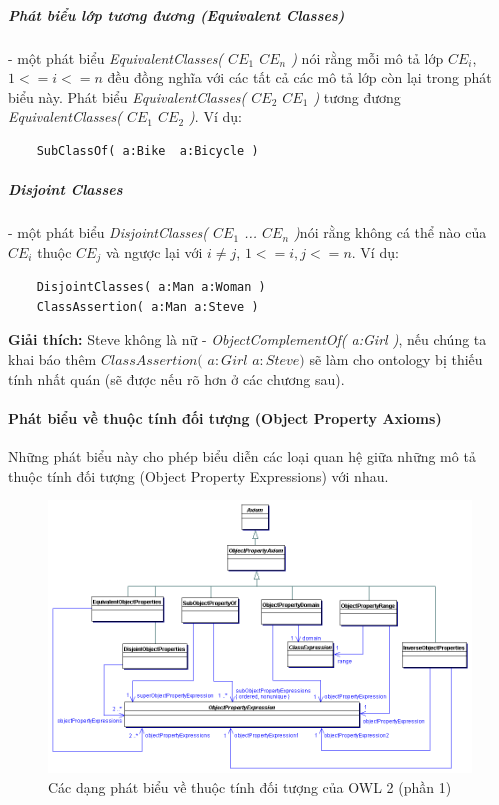 	\subparagraph{Phát biểu lớp tương đương (Equivalent Classes)} - một phát biểu \textit{EquivalentClasses( $CE_{1}$ $CE_{n}$ )} nói rằng mỗi mô tả lớp $CE_{i}$, $1<=i<=n$ đều đồng nghĩa với các tất cả các mô tả lớp còn lại trong phát biểu này. Phát biểu \textit{EquivalentClasses( $CE_{2}$ $CE_{1}$ )} tương đương \textit{EquivalentClasses( $CE_{1}$ $CE_{2}$ )}. Ví dụ:
	\begin{verbatim}
	SubClassOf( a:Bike  a:Bicycle )
	\end{verbatim}
	
	\subparagraph{Disjoint Classes} - một phát biểu \textit{DisjointClasses( $CE_{1}$ ... $CE_{n}$ )}nói rằng không cá thể nào của $CE_{i}$ thuộc $CE_{j}$ và ngược lại với $i \neq j$, $1<=i,j<=n$. Ví dụ:
	\begin{verbatim}
	DisjointClasses( a:Man a:Woman )	
	ClassAssertion( a:Man a:Steve )
	\end{verbatim}
	\textbf{Giải thích:} Steve không là nữ - \textit{ObjectComplementOf( a:Girl )}, nếu chúng ta khai báo thêm $ClassAssertion($ $a:Girl$ $a:Steve)$ sẽ làm cho ontology bị thiếu tính nhất quán (sẽ được nếu rõ hơn ở các chương sau).
	
	\paragraph{Phát biểu về thuộc tính đối tượng (Object Property Axioms)}
	Những phát biểu này cho phép biểu diễn các loại quan hệ giữa những mô tả thuộc tính đối tượng (Object Property Expressions) với nhau.
	\begin{figure}[h]
		\centering
		\includegraphics[width=160mm]{Figures/objectpropertyAxiom.png}
		\caption{Các dạng phát biểu về thuộc tính đối tượng của OWL 2 (phần 1)\label{overflow}}
	\end{figure}
	
